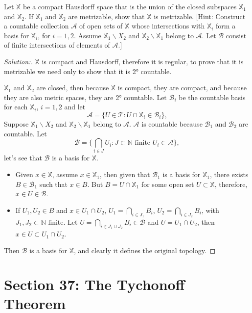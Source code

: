 \documentclass[a4paper,12pt, reqno]{article}
\theoremstyle{definition}
\newenvironment{exerr}[1]{
  \renewcommand\theexeralt{#1}
  \exeralt
}{\endexeralt}
\newenvironment{solution}{\begin{proof}[Solution:]}{\end{proof}}
\newcommand{\T}{\mathscr{T}}
\newcommand{\A}{\mathscr{A}}
\newcommand{\B}{\mathscr{B}}
\newcommand{\N}{\mathbb{N}}
\newcommand{\X}{\mathbb{X}}
\begin{document}
\begin{exerr}{9}
  Let $\X$ be a compact Hausdorff space that is the union of the closed subspaces $\X_{1}$ and $\X_{2}$. If $\X_{1}$ and $\X_{2}$ are metrizable, show that $\X$ is metrizable. [Hint: Construct a countable collection $\A$ of open sets of $\X$ whose intersections with $\X_{i}$ form a basis for $\X_{i}$, for $i=1,2$. Assume $\X_{1}\backslash X_{2}$ and $\X_{2}\backslash \X_{1}$ belong to $\A$. Let $\B$ consist of finite intersections of elements of $\A$.]
\end{exerr}
\begin{solution}
  $\X$ is compact and Hausdorff, therefore it is regular, to prove that it is metrizable we need only to show that it is 2° countable.

  $\X_{1}$ and $\X_{2}$ are closed, then because $\X$ is compact, they are compact, and because they are also metric spaces, they are 2° countable. Let $\B_{i}$ be the countable basis for each $\X_{i}$, $i=1,2$ and let 
  \begin{equation*}
      \A = \{ U\in \T : U\cap\X_{i}\in \B_{i} \},
  \end{equation*}
  Suppose $\X_{1}\backslash X_{2}$ and $\X_{2}\backslash \X_{1}$ belong to $\A$. $\A$ is countable because $\B_{1}$ and $\B_{2}$ are countable. Let
  \begin{equation*}
      \B = \{ \bigcap_{i\in J} U_{i} : J\subset\N \text{ finite }U_{i}\in \A \},
  \end{equation*}
  let's see that $\B$ is a basis for $\X$.
  \begin{itemize}
    \item Given $x\in\X$, assume $x\in\X_{1}$, then given that $\B_{1}$ is a basis for $\X_{1}$, there exists $B\in \B_{1}$ such that $x\in B$. But $B = U\cap\X_{1}$ for some open set $U\subset\X$, therefore, $x\in U\in\B$.
    \item If $U_{1},U_{2}\in B$ and $x\in U_{1}\cap U_{2}$, $U_{1} = \bigcap_{i\in J_{1}}B_{i}$, $U_{2} = \bigcap_{i\in J_{2}}B_{i}$, with $J_{1},J_{2}\subset\N$ finite. Let $U = \bigcap_{i\in J_{1}\cup J_{2}} B_{i}\in \B$ and $U = U_{1}\cap U_{2}$, then $x\in U\subset U_{1}\cap U_{2}$.
  \end{itemize}
  Then $\B$ is a basis for $\X$, and clearly it defines the original topology.
\end{solution}

\section*{Section 37: The Tychonoff Theorem}
\end{document}
